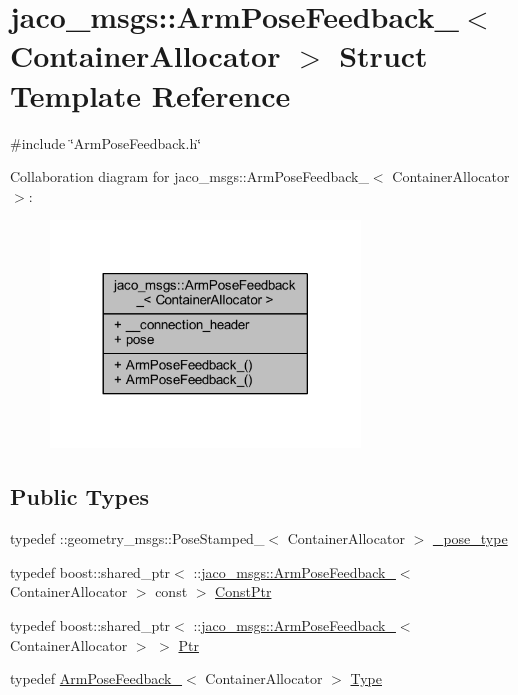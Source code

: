 \hypertarget{structjaco__msgs_1_1ArmPoseFeedback__}{}\section{jaco\+\_\+msgs\+:\+:Arm\+Pose\+Feedback\+\_\+$<$ Container\+Allocator $>$ Struct Template Reference}
\label{structjaco__msgs_1_1ArmPoseFeedback__}


{\ttfamily \#include \char`\"{}Arm\+Pose\+Feedback.\+h\char`\"{}}



Collaboration diagram for jaco\+\_\+msgs\+:\+:Arm\+Pose\+Feedback\+\_\+$<$ Container\+Allocator $>$\+:
\nopagebreak
\begin{figure}[H]
\begin{center}
\leavevmode
\includegraphics[width=233pt]{d5/da1/structjaco__msgs_1_1ArmPoseFeedback____coll__graph}
\end{center}
\end{figure}
\subsection*{Public Types}
\begin{DoxyCompactItemize}
\item 
typedef \+::geometry\+\_\+msgs\+::\+Pose\+Stamped\+\_\+$<$ Container\+Allocator $>$ \hyperlink{structjaco__msgs_1_1ArmPoseFeedback___afac74061a43c386a3dd24c0ce1324e5f}{\+\_\+pose\+\_\+type}
\item 
typedef boost\+::shared\+\_\+ptr$<$ \+::\hyperlink{structjaco__msgs_1_1ArmPoseFeedback__}{jaco\+\_\+msgs\+::\+Arm\+Pose\+Feedback\+\_\+}$<$ Container\+Allocator $>$ const  $>$ \hyperlink{structjaco__msgs_1_1ArmPoseFeedback___aec852ec0c94422af57d20783c92eb449}{Const\+Ptr}
\item 
typedef boost\+::shared\+\_\+ptr$<$ \+::\hyperlink{structjaco__msgs_1_1ArmPoseFeedback__}{jaco\+\_\+msgs\+::\+Arm\+Pose\+Feedback\+\_\+}$<$ Container\+Allocator $>$ $>$ \hyperlink{structjaco__msgs_1_1ArmPoseFeedback___a17751fca0051bc07bbb26d80626363b9}{Ptr}
\item 
typedef \hyperlink{structjaco__msgs_1_1ArmPoseFeedback__}{Arm\+Pose\+Feedback\+\_\+}$<$ Container\+Allocator $>$ \hyperlink{structjaco__msgs_1_1ArmPoseFeedback___ad737c60936d60a5a82957100855b1af9}{Type}
\end{DoxyCompactItemize}
